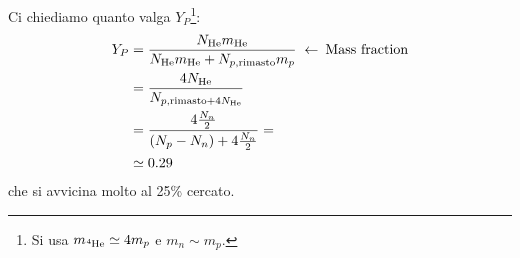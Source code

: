 Ci chiediamo quanto valga $Y_P$\footnote{Si usa $m_{\ce{^4He}}\simeq 4 m_p$ e $m_n \sim m_p$.}:
\begin{displaymath}
\begin{aligned}
Y_P &= \frac{N_{\ce{He}}m_{\ce{He}}}{N_{\ce{He}}m_{\ce{He}} + N_{p,\text{rimasto}}m_p} \;\leftarrow\: \text{Mass fraction}\\
&= \frac{4 N_{\ce{He}}}{N_{p,\text{rimasto} + 4N_{\ce{He}} }}\\
&= \frac{4 \frac{N_n}{2}}{(N_p - N_n) + 4\frac{N_n}{2}} = \\
&\simeq 0.29
\end{aligned}
\end{displaymath}
che si avvicina molto al 25\% cercato.




    